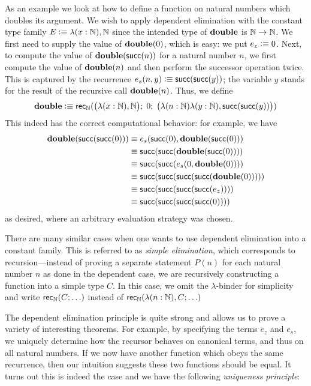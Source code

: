 As an example we look at how to define a function on natural numbers which doubles its argument. We wish to apply dependent elimination with the constant type family $E \vcentcolon\equiv \lambda(x : \mathbb{N}), \mathbb{N}$ since the intended type of $\mathbf{double}$ is $\mathbb{N} \to \mathbb{N}$. We first need to supply the value of $\mathbf{double}(0)$, which is easy: we put $e_z \vcentcolon\equiv 0$. Next, to compute the value of $\mathbf{double}(\mathsf{succ}(n))$ for a natural number $n$, we first compute the value of $\mathbf{double}(n)$ and then perform the successor operation twice. This is captured by the recurrence $e_s(n,y) \vcentcolon\equiv \mathsf{succ}(\mathsf{succ}(y))$; the variable $y$ stands for the result of the recursive call $\mathbf{double}(n)$. Thus, we define
\[ \mathbf{double} \vcentcolon\equiv \mathsf{rec}_{\mathbb{N}}(\big(\lambda(x :\mathbb{N}), \mathbb{N}\big); \; 0; \;  \big(\lambda(n: \mathbb{N}) \lambda (y:\mathbb{N}), \mathsf{succ}(\mathsf{succ}(y))\big)) \]
This indeed has the correct computational behavior: for example, we have 
\begin{align*}
\mathbf{double}(\mathsf{succ}(\mathsf{succ}(0))) & \equiv e_s(\mathsf{succ}(0), \mathbf{double}(\mathsf{succ}(0))) \\
                 & \equiv \mathsf{succ}(\mathsf{succ}(\mathbf{double}(\mathsf{succ}(0)))) \\
                 & \equiv \mathsf{succ}(\mathsf{succ}(e_s(0,\mathbf{double}(0)))) \\
                 & \equiv \mathsf{succ}(\mathsf{succ}(\mathsf{succ}(\mathsf{succ}(\mathbf{double}(0))))) \\
                 & \equiv \mathsf{succ}(\mathsf{succ}(\mathsf{succ}(\mathsf{succ}(e_z)))) \\
                 & \equiv \mathsf{succ}(\mathsf{succ}(\mathsf{succ}(\mathsf{succ}(0))))
\end{align*}
as desired, where an arbitrary evaluation strategy was chosen.

There are many similar cases when one wants to use dependent elimination into a constant family.
This is referred to as \emph{simple elimination}, which corresponds to recursion---instead of proving a separate statement $P(n)$ for each natural number $n$ as done in the dependent case, we are recursively constructing a function into a simple type $C$. In this case, we omit the $\lambda$-binder for simplicity and write $\mathsf{rec}_{\mathbb{N}}(C; \ldots)$ instead of $\mathsf{rec}_{\mathbb{N}}(\lambda (n : \mathbb{N}), C; \ldots)$

The dependent elimination principle is quite strong and allows us to prove a variety of interesting theorems. For example, by specifying the terms $e_z$ and $e_s$, we  uniquely determine how the recursor behaves on canonical terms, and thus on all natural numbers. If we now have another function which obeys the same recurrence, then our intuition suggests these two functions should be equal. It turns out this is indeed the case and we have the following \emph{uniqueness principle}:

